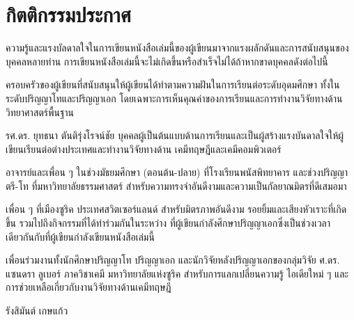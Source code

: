 

{

\chapter*{\centering กิตติกรรมประกาศ}

ความรู้และแรงบัลดาลใจในการเขียนหนังสือเล่มนี้ของผู้เขียนมาจากแรงผลักดันและการสนับสนุนของบุคคลหลายท่าน 
การเขียนหนังสือเล่มนี้จะไม่เกิดขึ้นหรือสำเร็จไม่ได้ถ้าหากขาดบุคคลดังต่อไปนี้

ครอบครัวของผู้เขียนที่สนับสนุนให้ผู้เขียนได้ทำตามความฝันในการเรียนต่อระดับอุดมศึกษา ทั้งในระดับปริญญาโทและปริญญาเอก 
โดยเฉพาะการเห็นคุณค่าของการเรียนและการทำงานวิจัยทางด้านวิทยาศาสตร์พื้นฐาน

รศ.ดร. ยุทธนา ตันติรุ่งโรจน์ชัย บุคคลผู้เป็นต้นแบบด้านการเรียนและเป็นผู้สร้างแรงบันดาลใจให้ผู้เขียนเรียนต่อต่างประเทศและทำงานวิจัยทางด้าน%
เคมีทฤษฎีและเคมีคอมพิวเตอร์

อาจารย์และเพื่อน ๆ ในช่วงมัธยมศึกษา (ตอนต้น-ปลาย) ที่โรงเรียนพนัสพิทยาคาร และช่วงปริญญาตรี-โท ที่มหาวิทยาลัยธรรมศาสตร์ 
สำหรับความทรงจำอันดีงามและความเป็นกัลยาณมิตรที่ดีเสมอมา

เพื่อน ๆ ที่เมืองซูริค ประเทศสวิตเซอร์แลนด์ สำหรับมิตรภาพอันดีงาม รอยยิ้มและเสียงหัวเราะที่เกิดขึ้น รวมไปถึงกิจกรรมที่ได้ทำร่วมกันในระหว่าง%
ที่ผู้เขียนกำลังศึกษาปริญญาเอกซึ่งเป็นช่วงเวลาเดียวกันกับที่ผู้เขียนกำลังเขียนหนังสือเล่มนี้

เพื่อนร่วมงานทั้งนักศึกษาปริญญาโท ปริญญาเอก และนักวิจัยหลังปริญญาเอกของกลุ่มวิจัย ศ.ดร. แซนดรา ลูเบอร์ ภาควิชาเคมี
มหาวิทยาลัยแห่งซูริค สำหรับการแลกเปลี่ยนความรู้ ไอเดียใหม่ ๆ และการช่วยเหลือเกี่ยวกับงานวิจัยทางด้านเคมีทฤษฎี

\medskip

\begin{flushright}
รังสิมันต์ เกษแก้ว
\end{flushright}
}
